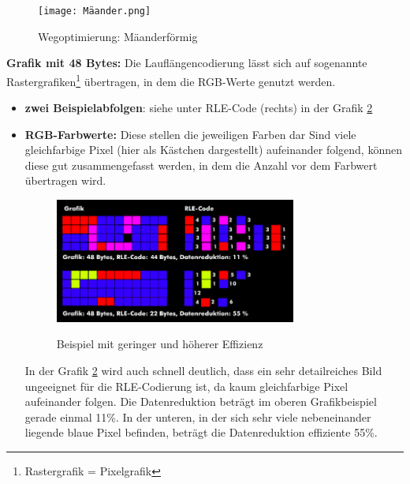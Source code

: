 \documentclass[11pt,a4paper,ngerman]{report}
\begin{document}
		
		
		 \begin{figure} [H]
			\begin{center}
				\texttt{[image: Mäander.png]}
				\caption{Wegoptimierung: Mäanderförmig}
				\cite{kocerheiztech}
				\label{mäander}
			\end{center}
		\end{figure}
		
	  \textbf{Grafik mit 48 Bytes:} Die Lauflängencodierung lässt sich auf sogenannte Rastergrafiken\footnote{Rastergrafik = Pixelgrafik} übertragen, in dem die RGB-Werte genutzt werden.
	  
			\begin{itemize}
				\item \textbf{zwei Beispielabfolgen}: siehe unter RLE-Code (rechts) in der Grafik \ref{Effizienz}
				
				\item \textbf{RGB-Farbwerte:} Diese stellen die jeweiligen Farben  dar 
				\subitem Sind viele gleichfarbige Pixel (hier als Kästchen dargestellt) aufeinander folgend, können diese gut zusammengefasst werden, in dem die Anzahl vor dem Farbwert übertragen wird.
				
				
				
				
				\begin{figure} [H]
				\begin{center}
						\includegraphics[width=0.75\textwidth]{g_h_Effizienz.png}
						\caption{Beispiel mit geringer und höherer Effizienz}
						\cite{ITWissen.info}
						\label{Effizienz}
					\end{center}
				\end{figure}
				
				\subitem In der Grafik \ref{Effizienz} wird auch schnell deutlich, dass ein sehr detailreiches Bild ungeeignet für die RLE-Codierung ist, da kaum gleichfarbige Pixel aufeinander folgen. Die Datenreduktion beträgt im oberen Grafikbeispiel gerade einmal 11\%. In der unteren, in der sich sehr viele nebeneinander liegende blaue Pixel befinden, beträgt die Datenreduktion effiziente 55\%.
			\end{itemize}
		
\end{document}
